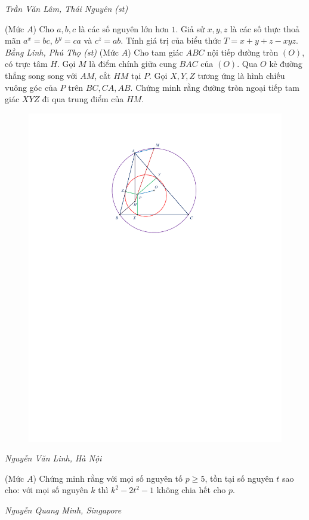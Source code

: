 \begin{multicols}{2}
	\begin{flushright}
		\textit{Trần Văn Lâm, Thái Nguyên (st)}
	\end{flushright}
	{}
	(Mức $A$) Cho $a,b,c$ là các số nguyên lớn hơn $1$. Giả sử $x,y,z$ là các số thực thoả mãn $a^x=bc$, $b^y=ca$ và $c^z=ab$. Tính giá trị của biểu thức $T=x+y+z-xyz$. 
	\vskip 0.05cm
		\hfill \textit{Bằng Linh, Phú Thọ (st)}
	\vskip 0.05cm
	\columnbreak
	{}
	(Mức $A$) Cho tam giác $ABC$ nội tiếp đường tròn $(O)$, có trực tâm $H$. Gọi $M$ là điểm chính giữa cung $BAC$ của $(O)$. Qua $O$ kẻ đường thẳng  song song với $AM$, cắt $HM$ tại $P$. Gọi $X,Y,Z$ tương ứng là hình chiếu vuông góc của $P$ trên $BC,CA,AB$. Chứng minh rằng đường tròn ngoại tiếp tam giác $XYZ$ đi qua trung điểm của $HM.$
	\begin{figure}[H]
		\vspace*{-10pt}
		\centering
		\captionsetup{labelformat= empty, justification=centering}
		\includegraphics[width= 1\linewidth]{P619}
		\vspace*{-15pt}
	\end{figure}
	\begin{flushright}
		\textit{Nguyễn Văn Linh, Hà Nội}
	\end{flushright}
	{}
	(Mức $A$) Chứng minh rằng với mọi số nguyên tố $p\ge5$, tồn tại số nguyên $t$ sao cho: với mọi số nguyên $k$ thì $k^2-2t^2-1$ không chia hết cho $p$.   
	\begin{flushright}
		\textit{Nguyễn Quang Minh, Singapore}
	\end{flushright}
\end{multicols}
